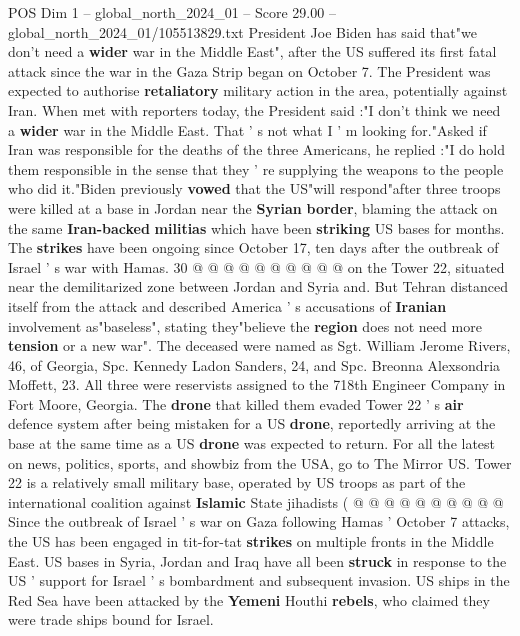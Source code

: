 \begin{textsample}{POS Dim 1 – global\_north\_2024\_01 – Score 29.00 – global\_north\_2024\_01/105513829.txt}  \label{ex:f1_pos_122}
President Joe Biden has said that"we don't need a \textbf{wider} war in the Middle East", after the US suffered its first fatal attack since the war in the Gaza Strip began on October 7.
The President was expected to authorise \textbf{retaliatory} military action in the area, potentially against Iran.
When met with reporters today, the President said :"I don't think we need a \textbf{wider} war in the Middle East.
That ' s not what I ' m looking for."Asked if Iran was responsible for the deaths of the three Americans, he replied :"I do hold them responsible in the sense that they ' re supplying the weapons to the people who did it."Biden previously \textbf{vowed} that the US"will respond"after three troops were killed at a base in Jordan near the \textbf{Syrian} \textbf{border}, blaming the attack on the same \textbf{Iran-backed} \textbf{militias} which have been \textbf{striking} US bases for months.
The \textbf{strikes} have been ongoing since October 17, ten days after the outbreak of Israel ' s war with Hamas. 30 @ @ @ @ @ @ @ @ @ @ on the Tower 22, situated near the demilitarized zone between Jordan and Syria and.
But Tehran distanced itself from the attack and described America ' s accusations of \textbf{Iranian} involvement as"baseless", stating they"believe the \textbf{region} does not need more \textbf{tension} or a new war".
The deceased were named as Sgt.
William Jerome Rivers, 46, of Georgia, Spc.
Kennedy Ladon Sanders, 24, and Spc.
Breonna Alexsondria Moffett, 23.
All three were reservists assigned to the 718th Engineer Company in Fort Moore, Georgia.
The \textbf{drone} that killed them evaded Tower 22 ' s \textbf{air} defence system after being mistaken for a US \textbf{drone}, reportedly arriving at the base at the same time as a US \textbf{drone} was expected to return.
For all the latest on news, politics, sports, and showbiz from the USA, go to The Mirror US.
Tower 22 is a relatively small military base, operated by US troops as part of the international coalition against \textbf{Islamic} State jihadists ( @ @ @ @ @ @ @ @ @ @ Since the outbreak of Israel ' s war on Gaza following Hamas ' October 7 attacks, the US has been engaged in tit-for-tat \textbf{strikes} on multiple fronts in the Middle East.
US bases in Syria, Jordan and Iraq have all been \textbf{struck} in response to the US ' support for Israel ' s bombardment and subsequent invasion.
US ships in the Red Sea have been attacked by the \textbf{Yemeni} Houthi \textbf{rebels}, who claimed they were trade ships bound for Israel.

\end{textsample}
